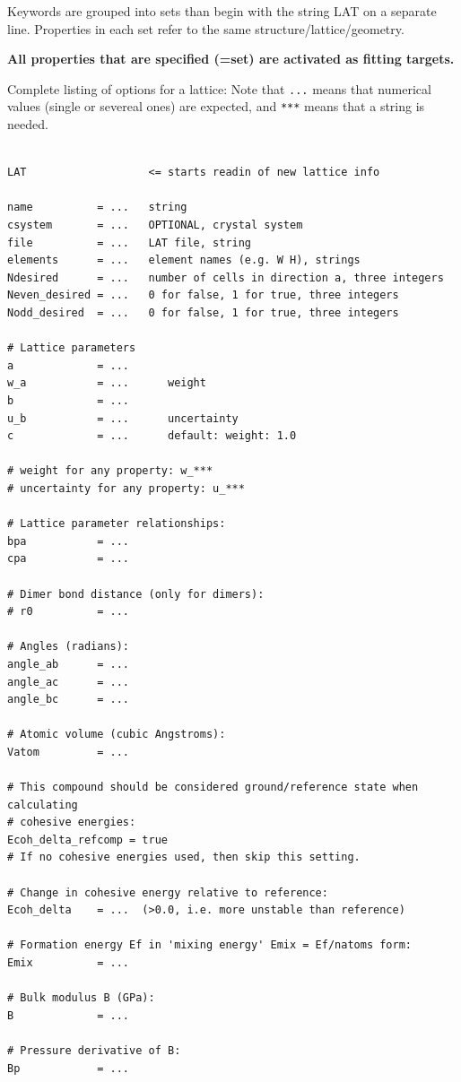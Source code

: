 \documentclass[a4paper,12pt,pdftex,onecolumn]{article}
\begin{document}
Keywords are grouped into sets than begin with the string
LAT on a separate line. Properties in each set refer to
the same structure/lattice/geometry.

\textbf{All properties that are specified (=set) are activated as fitting
targets.}


Complete listing of options for a lattice: Note that \verb+...+ means that
numerical values (single or severeal ones) are expected, and \verb+***+ means
that a string is needed.


\begin{Verbatim}[fontsize=\relsize{-1},frame=single]

LAT                   <= starts readin of new lattice info

name          = ...   string
csystem       = ...   OPTIONAL, crystal system
file          = ...   LAT file, string
elements      = ...   element names (e.g. W H), strings
Ndesired      = ...   number of cells in direction a, three integers
Neven_desired = ...   0 for false, 1 for true, three integers
Nodd_desired  = ...   0 for false, 1 for true, three integers

# Lattice parameters
a             = ...
w_a           = ...      weight
b             = ...      
u_b           = ...      uncertainty
c             = ...      default: weight: 1.0

# weight for any property: w_***
# uncertainty for any property: u_***

# Lattice parameter relationships:
bpa           = ...
cpa           = ...

# Dimer bond distance (only for dimers):
# r0          = ...

# Angles (radians):
angle_ab      = ...
angle_ac      = ...
angle_bc      = ...

# Atomic volume (cubic Angstroms):
Vatom         = ...

# This compound should be considered ground/reference state when calculating
# cohesive energies:
Ecoh_delta_refcomp = true
# If no cohesive energies used, then skip this setting.

# Change in cohesive energy relative to reference:
Ecoh_delta    = ...  (>0.0, i.e. more unstable than reference)

# Formation energy Ef in 'mixing energy' Emix = Ef/natoms form:
Emix          = ...

# Bulk modulus B (GPa):
B             = ...

# Pressure derivative of B:
Bp            = ...


\end{Verbatim}
\end{document}
